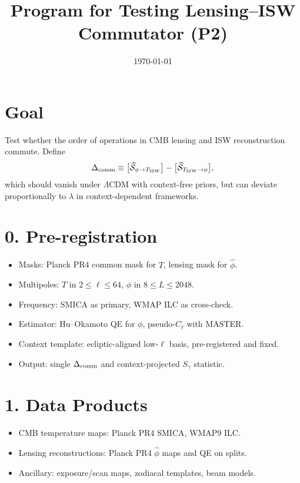 \documentclass[11pt]{article}
\title{Program for Testing Lensing--ISW Commutator (P2)}
\author{}
\date{\today}
\begin{document}
\maketitle

\section*{Goal}
Test whether the order of operations in CMB lensing and ISW reconstruction commute. Define
\begin{align}
\Delta_{\rm comm} \equiv 
\big[\widehat{\mathcal S}_{\phi \to T_{\rm ISW}}\big] - 
\big[\widehat{\mathcal S}_{T_{\rm ISW} \to \phi}\big],
\end{align}
which should vanish under $\Lambda$CDM with context-free priors, but can deviate proportionally to $\lambda$ in context-dependent frameworks.

\section*{0. Pre-registration}
\begin{itemize}
\item Masks: Planck PR4 common mask for $T$, lensing mask for $\hat{\phi}$.
\item Multipoles: $T$ in $2 \leq \ell \leq 64$, $\phi$ in $8 \leq L \leq 2048$.
\item Frequency: SMICA as primary, WMAP ILC as cross-check.
\item Estimator: Hu--Okamoto QE for $\phi$, pseudo-$C_\ell$ with MASTER.
\item Context template: ecliptic-aligned low-$\ell$ basis, pre-registered and fixed.
\item Output: single $\Delta_{\rm comm}$ and context-projected $S_\gamma$ statistic.
\end{itemize}

\section*{1. Data Products}
\begin{itemize}
\item CMB temperature maps: Planck PR4 SMICA, WMAP9 ILC.
\item Lensing reconstructions: Planck PR4 $\hat{\phi}$ maps and QE on splits.
\item Ancillary: exposure/scan maps, zodiacal templates, beam models.
\end{itemize}
\end{document}
